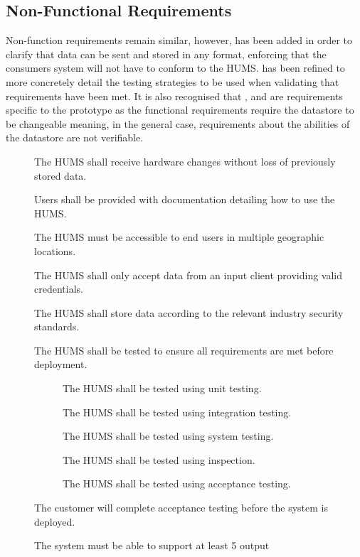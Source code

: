\subsection{Non-Functional Requirements}
Non-function requirements remain similar, however,  has been 
added in order to clarify that data can be sent and stored in any format, 
enforcing that the consumers system will not have to conform to the HUMS. 
 has been refined to more concretely detail the testing strategies to 
be used when validating that requirements have been met.
It is also recognised that ,  and  are requirements 
specific to the prototype as the functional requirements require the 
datastore to be changeable meaning, in the general case, requirements 
about the abilities of the datastore are not verifiable.
\begin{description}
	\item[] The HUMS shall receive hardware changes without loss 
	of previously stored data.
	\item[]  Users shall be provided with documentation detailing 
	how 	to use the HUMS.
	\item[] The HUMS must be accessible to end users in multiple 	
	geographic locations.
	\item[]  The HUMS shall only accept data from an input client 	
	providing valid credentials. 
	\item[] The HUMS shall store data according to the relevant 	
	industry security standards. 
	\item[]  The HUMS shall be tested to ensure all requirements are 
	met before deployment.
	\begin{description}
	\item[]  The HUMS shall be tested using unit testing.
	\item[]  The HUMS shall be tested using integration testing.
	\item[]  The HUMS shall be tested using system testing.
	\item[]  The HUMS shall be tested using inspection.
	\item[]  The HUMS shall be tested using acceptance testing.
	\end{description}
	\item[] The customer will complete acceptance testing before the 
	system is deployed.
	\item[] The system must be able to support at least 5 output 

\end{description}
